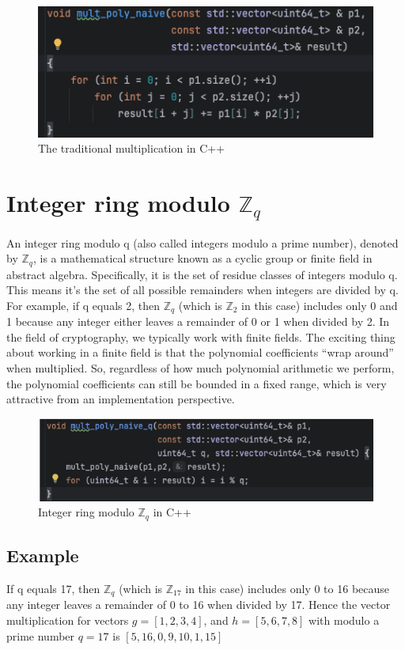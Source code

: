 \documentclass{techrep}
\theoremstyle{definition}
\theoremstyle{plain}
\newcommand{\Z}{\mathbb{Z}}
\begin{document}
\begin{figure}[H]
 	\centering
 	\includegraphics[width=.8\columnwidth]{fig/naive_poly_mult.png}
 	\caption{The traditional multiplication in C++} 
\label{fig:naive_poly_mult}
\end{figure}


\section{Integer ring modulo $\Z_{q}$}
An integer ring modulo q (also called integers modulo a prime number), denoted by $\Z_{q}$, is a mathematical structure known as a cyclic group or finite field in abstract algebra. Specifically, it is the set of residue classes of integers modulo q. This means it's the set of all possible remainders when integers are divided by q.
For example, if q equals 2, then $\Z_{q}$ (which is $\Z_{2}$ in this case) includes only 0 and 1 because any integer either leaves a remainder of 0 or 1 when divided by 2. In the field of cryptography, we typically work with finite fields. The exciting thing about working in a finite field is that the polynomial coefficients “wrap around” when multiplied. So, regardless of how much polynomial arithmetic we perform, the polynomial coefficients can still be bounded in a fixed range, which is very attractive from an implementation perspective.

\begin{figure}[H]
 	\centering
 	\includegraphics[width=.9\columnwidth]{fig/Zq_Cplus.png}
 	\caption{Integer ring modulo $\Z_{q}$ in C++} 
\label{fig:Zq_Cplus}
\end{figure}


\subsection{Example}
If q equals 17, then $\Z_{q}$ (which is $\Z_{17}$ in this case) includes only 0 to 16 because any integer leaves a remainder of 0 to 16 when divided by 17. Hence the vector multiplication for vectors $g = [1, 2, 3, 4]$, and $h = [5, 6, 7, 8]$ with modulo a prime number $q = 17$ is  $[5, 16, 0, 9, 10, 1, 15]$
\end{document}
